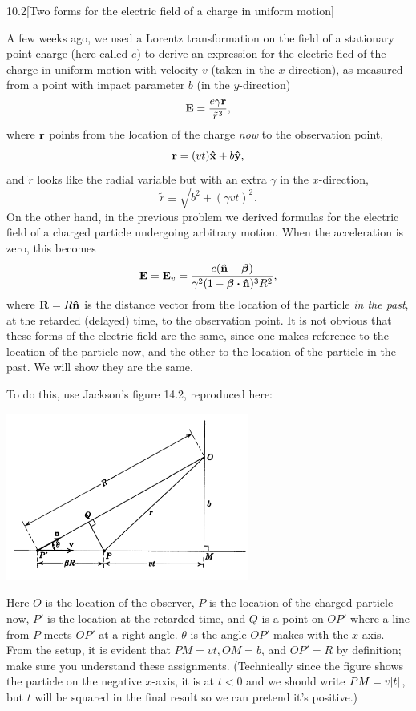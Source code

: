 \documentclass[12pt]{article}
\begin{document}
\begin{problem}{10.2}[Two forms for the electric field of a charge in uniform
    motion]

A few weeks ago, we used a Lorentz transformation on the field of a stationary
point charge (here called $e$) to derive an expression for the electric fied of
the charge in uniform motion with velocity $v$ (taken in the $x$-direction), as
measured from a point with impact parameter $b$ (in the $y$-direction)
\begin{equation}
    \vb{E}=\frac{e\gamma \vb{r}}{\tilde{r}^3}, 
\end{equation}
where $\vb{r}$ points from the location of the charge \textit{now} to the
observation point,
\begin{equation}
    \vb{r}=(vt)\vb{\hat{x}}+b\vb{\hat{y}}, 
\end{equation}
and $\tilde{r}$ looks like the radial variable but with an extra $\gamma$ in the
$x$-direction,
\begin{equation}
    \tilde{r}\equiv\sqrt{b^2+(\gamma vt)^2}. 
\end{equation}
On the other hand, in the previous problem we derived formulas for the electric
field of a charged particle undergoing arbitrary motion. When the acceleration
is zero, this becomes
\begin{equation}\label{p2:E}
    \vb{E}=\vb{E}_v=\frac{e(\nhat-\bm\beta)}{\gamma^2(1-\bm\beta\vdot\nhat)^3R^2}, 
\end{equation}
where $\vb{R}=R\vb{\hat{n}}$ is the distance vector from the location of the particle
\textit{in the past}, at the retarded (delayed) time, to the observation point.
It is not obvious that these forms of the electric field are the same, since one
makes reference to the location of the particle now, and the other to the
location of the particle in the past. We will show they are the same.

To do this, use Jackson's figure 14.2, reproduced here:
\begin{center}
    \includegraphics[width=0.6\textwidth]{p2.png} 
\end{center}
Here $O$ is the location of the observer, $P$ is the location of the charged
particle now, $P'$ is the location at the retarded time, and $Q$ is a point on
$OP'$ where a line from $P$ meets $OP'$ at a right angle. $\theta$ is the angle
$OP'$ makes with the $x$ axis. From the setup, it is evident that $PM=vt,OM=b$,
and $OP'=R$ by definition; make sure you understand these assignments.
(Technically since the figure shows the particle on the negative $x$-axis, it is
at $t<0$ and we should write $PM=v\abs{t}$, but $t$ will be squared in the final
result so we can pretend it's positive.)


\end{problem}
\end{document}
